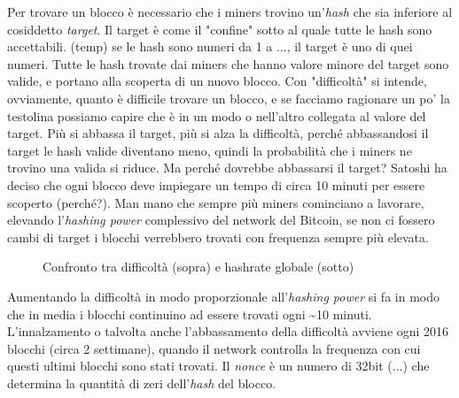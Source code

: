 \documentclass {article}
\begin{document}
Per trovare un blocco è necessario che i miners trovino un'\textit{hash} che sia inferiore al cosiddetto \textit{target}. Il target è come il "confine" sotto al quale tutte le hash sono accettabili.
(temp) se le hash sono numeri da 1 a ..., il target è uno di quei numeri.
Tutte le hash trovate dai miners che hanno valore minore del target sono valide, e portano alla scoperta di un nuovo blocco.
Con "difficoltà" si intende, ovviamente, quanto è difficile trovare un blocco, e se facciamo ragionare un po' la testolina possiamo capire che è in un modo o nell'altro collegata al valore del target.
Più si abbassa il target, più si alza la difficoltà, perché abbassandosi il target le hash valide diventano meno, quindi la probabilità che i miners ne trovino una valida si riduce.
Ma perché dovrebbe abbassarsi il target?
Satoshi ha deciso che ogni blocco deve impiegare un tempo di circa 10 minuti per essere scoperto (perché?).
Man mano che sempre più miners cominciano a lavorare, elevando l'\textit{hashing power} complessivo del network del Bitcoin, se non ci fossero cambi di target i blocchi verrebbero trovati con frequenza sempre più elevata.

\vspace {0.5cm}
\begin{figure}
\caption {Confronto tra difficoltà (sopra) e hashrate globale (sotto)}
\end{figure}
\vspace {0.2cm}
\noindent
%
Aumentando la difficoltà in modo proporzionale all'\textit{hashing power} si fa in modo che in media i blocchi continuino ad essere trovati ogni \textasciitilde 10 minuti.
L'innalzamento o talvolta anche l'abbassamento della difficoltà avviene ogni 2016 blocchi (circa 2 settimane), quando il network controlla la frequenza con cui questi ultimi blocchi sono stati trovati.
Il \textit{nonce} è un numero di 32bit (...) che determina la quantità di zeri dell'\textit{hash} del blocco.
\end{document}
